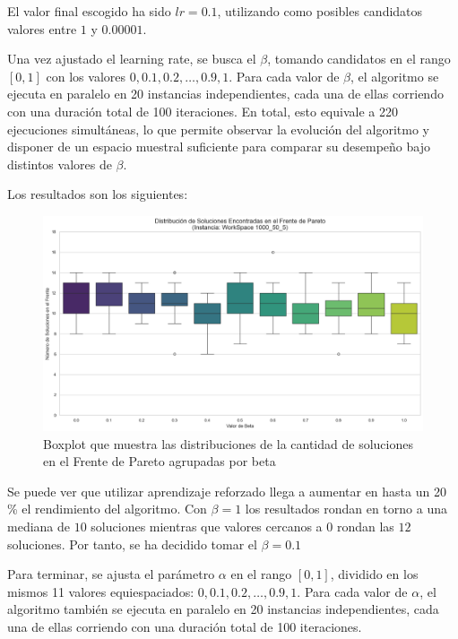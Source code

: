 \documentclass[12pt,a4paper]{book}
\begin{document}
El valor final escogido ha sido $lr=0.1$, utilizando como posibles candidatos valores entre $1$ y $0.00001$.

Una vez ajustado el learning rate, se busca el $\beta$, tomando candidatos en el rango $[0,1]$ con los valores $0, 0.1, 0.2, \dots, 0.9, 1$.  
Para cada valor de $\beta$, el algoritmo se ejecuta en paralelo en 20 instancias independientes, cada una de ellas corriendo con una duración total de 100 iteraciones. 
En total, esto equivale a 220 ejecuciones simultáneas, lo que permite observar la evolución del algoritmo y disponer de un espacio muestral suficiente para comparar su desempeño bajo distintos valores de $\beta$.

Los resultados son los siguientes:

\begin{figure}[H]
    \centering
    \includegraphics[width=\linewidth]{images_finetuning/beta_20_100.png}
    \caption{Boxplot que muestra las distribuciones de la cantidad de soluciones en el Frente de Pareto agrupadas por beta }
    \label{fig:beta}
\end{figure}

Se puede ver que utilizar aprendizaje reforzado llega a aumentar en hasta un 20 \% el rendimiento del algoritmo. Con $\beta=1$ los resultados rondan en torno a una mediana de $10$ soluciones mientras que valores cercanos a $0$ rondan las $12$ soluciones. Por tanto, se ha decidido tomar el $\beta=0.1$

Para terminar, se ajusta el parámetro $\alpha$ en el rango $[0,1]$, dividido en los mismos 11 valores equiespaciados: $0, 0.1, 0.2, \dots, 0.9, 1$.  
Para cada valor de $\alpha$, el algoritmo también se ejecuta en paralelo en 20 instancias independientes, cada una de ellas corriendo con una duración total de 100 iteraciones.
\end{document}
